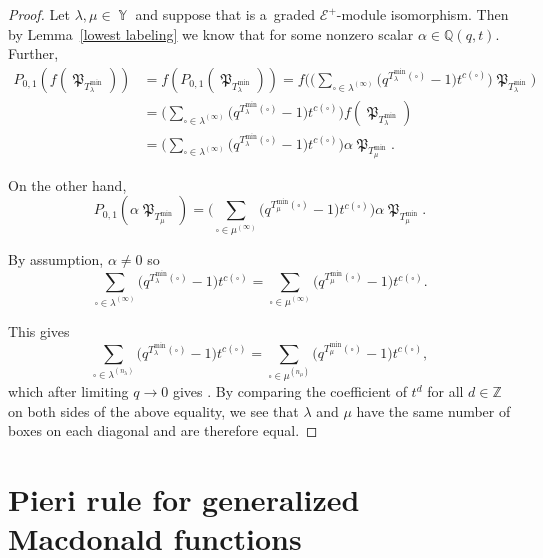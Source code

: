 \documentclass[10pt,a4paper]{amsart}
\numberwithin{equation}{section}
\theoremstyle{definition}
\DeclareMathOperator{\Par}{\mathbb{Y}}
\DeclareMathOperator{\MacD}{\mathfrak{P}}
\begin{document}
\begin{proof}
 Let $\lambda, \mu \in \Par$ and suppose that  is a~graded $\mathcal{E}^{+}$-module isomorphism. Then by Lemma~\ref{lowest labeling} we know that
 \smash{$
 f(\MacD_{T^{\min}_{\lambda}}) = \alpha \MacD_{T^{\min}_{\mu}}
$}
 for some nonzero scalar $\alpha \in \mathbb{Q}(q,t)$. Further,
 \begin{align*}
 P_{0,1}(f(\MacD_{T^{\min}_{\lambda}})) &= f(P_{0,1}(\MacD_{T^{\min}_{\lambda}}))
 = f\biggl(\biggl(\sum_{\square\in \lambda^{(\infty)}}\bigl(q^{T^{\min}_{\lambda}(\square)}-1\bigr)t^{c(\square)}\biggr)\MacD_{T^{\min}_{\lambda}}\biggr) \\
 & = \biggl(\sum_{\square\in \lambda^{(\infty)}}\bigl(q^{T^{\min}_{\lambda}(\square)}-1\bigr)t^{c(\square)}\biggr)f(\MacD_{T^{\min}_{\lambda}}) \\
 & = \biggl(\sum_{\square\in \lambda^{(\infty)}}\bigl(q^{T^{\min}_{\lambda}(\square)}-1\bigr)t^{c(\square)}\biggr) \alpha \MacD_{T^{\min}_{\mu}}.
 \end{align*}

 On the other hand,
 \[
 P_{0,1}(\alpha \MacD_{T^{\min}_{\mu}}) = \biggl(\sum_{\square\in \mu^{(\infty)}}\bigl(q^{T^{\min}_{\mu}(\square)}-1\bigr)t^{c(\square)}\biggr)\alpha \MacD_{T^{\min}_{\mu}}.
 \]

 By assumption, $\alpha \neq 0$ so
 \[
 \sum_{\square\in \lambda^{(\infty)}}\bigl(q^{T^{\min}_{\lambda}(\square)}-1\bigr)t^{c(\square)} = \sum_{\square\in \mu^{(\infty)}}\bigl(q^{T^{\min}_{\mu}(\square)}-1\bigr)t^{c(\square)}.
 \]


 This gives
 \[
 \sum_{\square\in \lambda^{(n_{\lambda})}}\bigl(q^{T^{\min}_{\lambda}(\square)}-1\bigr)t^{c(\square)} = \sum_{\square\in \mu^{(n_{\mu})}}\bigl(q^{T^{\min}_{\mu}(\square)}-1\bigr)t^{c(\square)},
 \]
 which after limiting $q \rightarrow 0$ gives
.
 By comparing the coefficient of $t^d$ for all $d \in \mathbb{Z}$ on both sides of the above equality, we see that $\lambda$ and $\mu$ have the same number of boxes on each diagonal and are therefore equal.
\end{proof}

\section{Pieri rule for generalized Macdonald functions}\label{Pieri Rule section}
\end{document}
